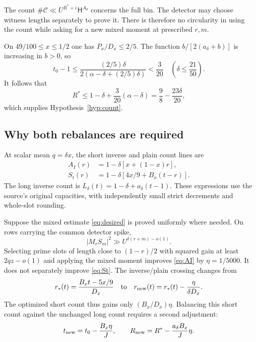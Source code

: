 \documentclass[11pt]{article}
\theoremstyle{definition}
\theoremstyle{remark}
\numberwithin{equation}{section}
\newcommand{\CC}{\mathcal C}
\newcommand{\HH}{\mathsf H}
\newcommand{\ee}{\varepsilon}
\begin{document}
The count $\#\CC\ll U^{R^*+\ee}\HH^{A_0}$ concerns the full bin.
The detector may choose witness lengths separately to prove it.
There is therefore no circularity in using the count while asking for
a new mixed moment at prescribed $r,m$.

On $49/100\le x\le1/2$ one has $P_x/D_x\le2/5$. The function
$b/[2(a_\delta+b)]$ is increasing in $b>0$, so
\[
t_0-1
\le\frac{(2/5)\delta}{2(\alpha-\delta+(2/5)\delta)}
<\frac3{20}
\quad\left(\delta\le\frac{21}{50}\right).
\]
It follows that
\[
R^*\le1-\delta+\frac3{20}(\alpha-\delta)
=\frac98-\frac{23\delta}{20},
\]
which supplies Hypothesis~\ref{hyp:count}.

\subsection{Why both rebalances are required}

At scalar mean $q=\delta x$, the short inverse and plain count lines
are
\begin{align}
A_I(r)&=1-\delta[x+(1-x)r],\label{eq:AI}\\
S_t(r)&=1-\delta[4x/9+B_x(t-r)].\label{eq:St}
\end{align}
The long inverse count is
$L_\delta(t)=1-\delta+a_\delta(t-1)$. These expressions use the
source's original capacities, with independently small strict
decrements and whole-slot rounding.

Suppose the mixed estimate \eqref{eq:desired} is proved uniformly
where needed. On rows carrying the common detector spike,
\[
|M_rS_m|^2\gg U^{\delta(r+m)-o(1)}.
\]
Selecting prime slots of length close to $(1-r)/2$ with squared
gain at least $2qz-o(1)$ and applying the mixed moment improves
\eqref{eq:AI} by $\eta=1/5000$. It does not separately improve
\eqref{eq:St}. The inverse/plain crossing changes from
\[
r_*(t)=\frac{B_xt-5x/9}{D_x}
\quad\hbox{to}\quad
r_{\rm new}(t)=r_*(t)-\frac{\eta}{\delta D_x}.
\]
The optimized short count thus gains only $(B_x/D_x)\eta$.
Balancing this short count against the unchanged long count requires
a second adjustment:
\begin{equation}\label{eq:rebalance}
t_{\rm new}=t_0-\frac{B_x\eta}{J},\qquad
R_{\rm new}=R^*-\frac{a_\delta B_x}{J}\eta.
\end{equation}
\end{document}

